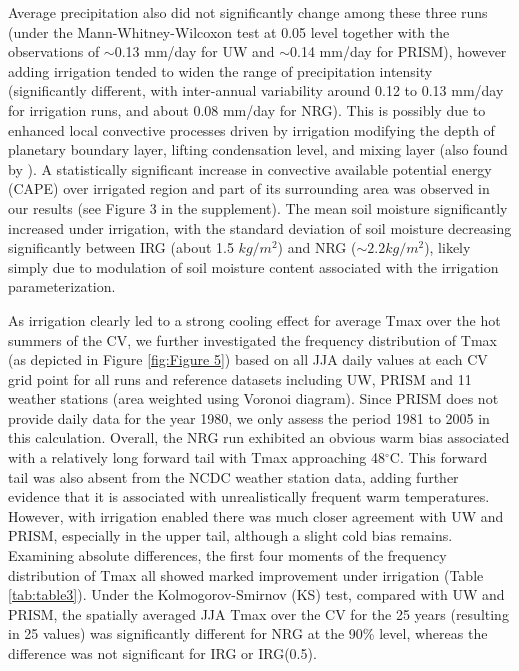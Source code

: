 \documentclass[draft,ms]{agutex}   %
\begin{document}
\begin{article}
Average precipitation also did not significantly change among these three runs (under the Mann-Whitney-Wilcoxon test at 0.05 level together with the observations of $\sim$0.13 mm/day for UW and $\sim$0.14 mm/day for PRISM), however adding irrigation tended to widen the range of precipitation intensity (significantly different, with inter-annual variability around 0.12 to 0.13 mm/day for irrigation runs, and about 0.08 mm/day for NRG). This is possibly due to enhanced local convective processes driven by irrigation modifying the depth of planetary boundary layer, lifting condensation level, and mixing layer (also found by \cite{kawase2008impact, deangelis2010evidence, qian2013modeling}).  A statistically significant increase in convective available potential energy (CAPE) over irrigated region and part of its surrounding area was observed in our results (see Figure 3 in the supplement). The mean soil moisture significantly increased under irrigation, with the {\color{red}standard deviation} of soil moisture decreasing significantly between IRG (about 1.5 $kg/m^2$) and NRG ($\sim2.2 kg/m^2$), likely simply due to modulation of soil moisture content associated with the irrigation parameterization.

As irrigation clearly led to a strong cooling effect for average Tmax over the hot summers of the CV, we further investigated the frequency distribution of Tmax (as depicted in Figure \ref{fig:Figure 5}) based on all JJA daily values at each CV grid point for all runs and reference datasets including UW, PRISM and 11 weather stations (area weighted using Voronoi diagram). Since PRISM does not provide daily data for the year 1980, we only assess the period 1981 to 2005 in this calculation. Overall, the NRG run exhibited an obvious warm bias associated with a relatively long forward tail with Tmax approaching 48$^\circ$C.  This forward tail was also absent from the NCDC weather station data, adding further evidence that it is associated with unrealistically frequent warm temperatures. However, with irrigation enabled there was much closer agreement with UW and PRISM, especially in the upper tail, although a slight cold bias remains. Examining absolute differences, the first four moments of the frequency distribution of Tmax all showed marked improvement under irrigation (Table \ref{tab:table3}). Under the Kolmogorov-Smirnov (KS) test, compared with UW and PRISM, the spatially averaged JJA Tmax over the CV for the 25 years (resulting in 25 values) was significantly different for NRG at the 90\% level, whereas the difference was not significant for IRG or IRG(0.5).


\end{article}
\end{document}
